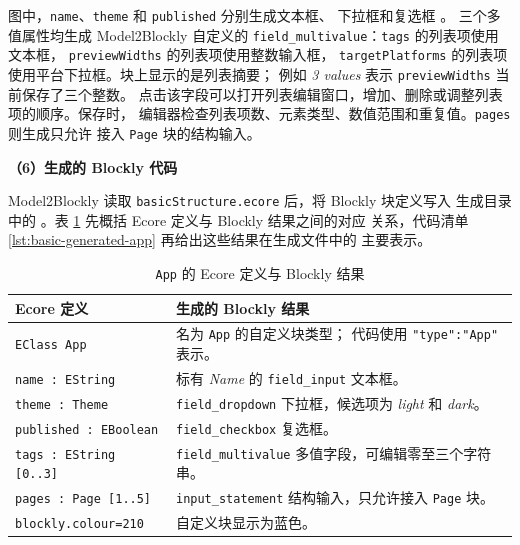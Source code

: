 \begin{enumerate}
  图中，\texttt{name}、\texttt{theme} 和 \texttt{published} 分别生成文本框、
  下拉框和复选框
  \cite{blocklyTextInputField,blocklyDropdownField,blocklyCheckboxField}。
  三个多值属性均生成 Model2Blockly 自定义的
  \texttt{field\_multivalue}：\texttt{tags} 的列表项使用文本框，
  \texttt{previewWidths} 的列表项使用整数输入框，
  \texttt{targetPlatforms} 的列表项使用平台下拉框。块上显示的是列表摘要；
  例如 \emph{3 values} 表示 \texttt{previewWidths} 当前保存了三个整数。
  点击该字段可以打开列表编辑窗口，增加、删除或调整列表项的顺序。保存时，
  编辑器检查列表项数、元素类型、数值范围和重复值。\texttt{pages} 则生成只允许
  接入 \texttt{Page} 块的结构输入。

  \textbf{（6）生成的 Blockly 代码}

  Model2Blockly 读取 \texttt{basicStructure.ecore} 后，将 Blockly 块定义写入
  生成目录中的 。表
  \ref{tab:basic-app-code-mapping} 先概括 Ecore 定义与 Blockly 结果之间的对应
  关系，代码清单 \ref{lst:basic-generated-app} 再给出这些结果在生成文件中的
  主要表示。

\begin{table}[H]
  \centering
  \small
  \caption{\texttt{App} 的 Ecore 定义与 Blockly 结果}
  \label{tab:basic-app-code-mapping}
  \renewcommand{\arraystretch}{1.18}
  \begin{tabular}{@{}>{\raggedright\arraybackslash}p{}
                      >{\raggedright\arraybackslash}p{}@{}}
    \toprule
    \textbf{Ecore 定义} & \textbf{生成的 Blockly 结果} \\
    \midrule
    \texttt{EClass App}
      & 名为 \texttt{App} 的自定义块类型；
        代码使用 \texttt{"type":"App"} 表示。 \\
    \texttt{name : EString}
      & 标有 \emph{Name} 的 \texttt{field\_input} 文本框。 \\
    \addlinespace
    \texttt{theme : Theme}
      & \texttt{field\_dropdown} 下拉框，候选项为
        \emph{light} 和 \emph{dark}。 \\
    \addlinespace
    \texttt{published : EBoolean}
      & \texttt{field\_checkbox} 复选框。 \\
    \addlinespace
    \texttt{tags : EString [0..3]}
      & \texttt{field\_multivalue} 多值字段，可编辑零至三个字符串。 \\
    \addlinespace
    \texttt{pages : Page [1..5]}
      & \texttt{input\_statement} 结构输入，只允许接入
        \texttt{Page} 块。 \\
    \addlinespace
    \texttt{blockly.colour=210}
      & 自定义块显示为蓝色。 \\
    \bottomrule
  \end{tabular}
\end{table}


\end{enumerate}
